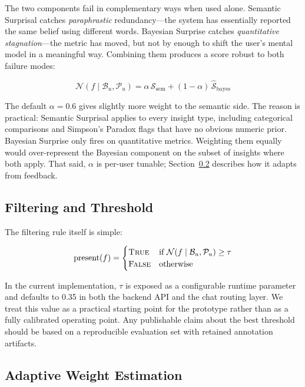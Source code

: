 \documentclass[conference]{IEEEtran}
\begin{document}
The two components fail in complementary ways when used alone.
Semantic Surprisal catches \emph{paraphrastic} redundancy---the
system has essentially reported the same belief using different words.
Bayesian Surprise catches \emph{quantitative stagnation}---the
metric has moved, but not by enough to shift the user's mental model
in a meaningful way. Combining them produces a score robust to both
failure modes:

\begin{equation}
  \mathcal{N}(f \mid \mathcal{B}_u, \mathcal{P}_u)
    = \alpha\,\mathcal{S}_{\text{sem}}
      + (1 - \alpha)\,\hat{\mathcal{S}}_{\text{bayes}}
  \label{eq:hybrid}
\end{equation}

The default $\alpha = 0.6$ gives slightly more weight to the semantic
side. The reason is practical: Semantic Surprisal applies to every
insight type, including categorical comparisons and Simpson's Paradox
flags that have no obvious numeric prior. Bayesian Surprise only fires
on quantitative metrics. Weighting them equally would over-represent
the Bayesian component on the subset of insights where both apply.
That said, $\alpha$ is per-user tunable; Section~\ref{sec:alpha_tuning}
describes how it adapts from feedback.

\subsection{Filtering and Threshold}

The filtering rule itself is simple:

\begin{equation}
  \text{present}(f) =
  \begin{cases}
    \textsc{True}  & \text{if } \mathcal{N}(f \mid \mathcal{B}_u, \mathcal{P}_u) \geq \tau \\
    \textsc{False} & \text{otherwise}
  \end{cases}
  \label{eq:filter}
\end{equation}

In the current implementation, $\tau$ is exposed as a configurable
runtime parameter and defaults to 0.35 in both the backend API and the
chat routing layer. We treat this value as a practical starting point
for the prototype rather than as a fully calibrated operating point.
Any publishable claim about the best threshold should be based on a
reproducible evaluation set with retained annotation artifacts.

\subsection{Adaptive Weight Estimation}
\label{sec:alpha_tuning}
\end{document}
